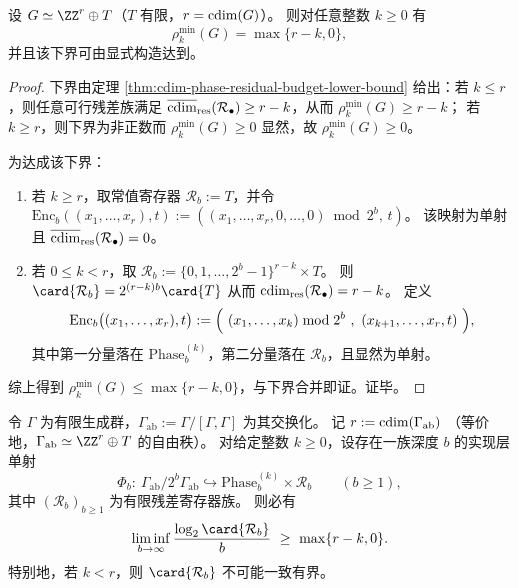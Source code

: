 \begin{theorem}[圆维预算区域的完备刻画与可达性]\label{thm:cdim-budget-completeness}
设 \(G\simeq \ZZ^r\oplus T\)（\(T\) 有限，\(r=\operatorname{cdim}(G)\)）。
则对任意整数 \(k\ge 0\) 有
\[
\rho_k^{\min}(G)=\max\{r-k,0\},
\]
并且该下界可由显式构造达到。
\end{theorem}
\begin{proof}
下界由定理 \ref{thm:cdim-phase-residual-budget-lower-bound} 给出：若 \(k\le r\)，则任意可行残差族满足
\(\overline{\operatorname{cdim}}_{\mathrm{res}}(\mathcal{R}_\bullet)\ge r-k\)，从而 \(\rho_k^{\min}(G)\ge r-k\)；
若 \(k\ge r\)，则下界为非正数而 \(\rho_k^{\min}(G)\ge 0\) 显然，故 \(\rho_k^{\min}(G)\ge 0\)。
\par
为达成该下界：
\begin{enumerate}
  \item 若 \(k\ge r\)，取常值寄存器 \(\mathcal{R}_b:=T\)，并令
  \(
  \mathrm{Enc}_b((x_1,\dots,x_r),t):=((x_1,\dots,x_r,0,\dots,0)\bmod 2^b,\,t)
  \)。
  该映射为单射且 \(\overline{\operatorname{cdim}}_{\mathrm{res}}(\mathcal{R}_\bullet)=0\)。
  \item 若 \(0\le k<r\)，取
  \(
  \mathcal{R}_b:=\{0,1,\dots,2^b-1\}^{r-k}\times T
  \)。
  则 \(\card{\mathcal{R}_b}=2^{(r-k)b}\card{T}\) 从而 \(\operatorname{cdim}_{\mathrm{res}}(\mathcal{R}_\bullet)=r-k\)。
  定义
  \[
  \mathrm{Enc}_b\bigl((x_1,\dots,x_r),t\bigr)
  :=
  \Bigl(\ (x_1,\dots,x_k)\bmod 2^b\ ,\ (x_{k+1},\dots,x_r,t)\ \Bigr),
  \]
  其中第一分量落在 \(\mathrm{Phase}_b^{(k)}\)，第二分量落在 \(\mathcal{R}_b\)，且显然为单射。
\end{enumerate}
综上得到 \(\rho_k^{\min}(G)\le \max\{r-k,0\}\)，与下界合并即证。证毕。
\end{proof}

\begin{corollary}[非交换系统的交换化圆维瓶颈]\label{cor:cdim-abelianization-bottleneck}
令 \(\Gamma\) 为有限生成群，\(\Gamma_{\mathrm{ab}}:=\Gamma/[\Gamma,\Gamma]\) 为其交换化。
记
\(
r:=\operatorname{cdim}(\Gamma_{\mathrm{ab}})
\)
（等价地，\(\Gamma_{\mathrm{ab}}\simeq \ZZ^r\oplus T\) 的自由秩）。
对给定整数 \(k\ge 0\)，设存在一族深度 \(b\) 的实现层单射
\[
\Phi_b:\ \Gamma_{\mathrm{ab}}/2^b\Gamma_{\mathrm{ab}}\hookrightarrow \mathrm{Phase}_b^{(k)}\times \mathcal{R}_b
\qquad(b\ge 1),
\]
其中 \((\mathcal{R}_b)_{b\ge 1}\) 为有限残差寄存器族。
则必有
\[
\liminf_{b\to\infty}\frac{\log_2\card{\mathcal{R}_b}}{b}
\ \ge\
\max\{r-k,0\}.
\]
特别地，若 \(k<r\)，则 \(\card{\mathcal{R}_b}\) 不可能一致有界。
\end{corollary}


